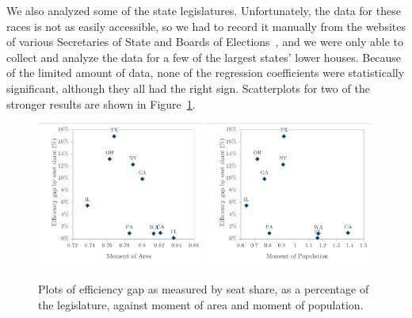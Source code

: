 \documentclass[12pt]{article}
\begin{document}
  We also analyzed some of the state legislatures.  Unfortunately, the data for these races is not as easily accessible, so we had to record it manually from the websites of various Secretaries of State and Boards of Elections~\cite{heda,florida,georgia,illinois,newyork,washington}, and we were only able to collect and analyze the data for a few of the largest states' lower houses.  Because of the limited amount of data, none of the regression coefficients were statistically significant, although they all had the right sign.  Scatterplots for two of the stronger results are shown in Figure~\ref{f:stateplots}.

  \begin{figure}
    \begin{center}
      \includegraphics[width=0.49\textwidth]{sldl-ssp-moment_area.pdf}
      \includegraphics[width=0.49\textwidth]{sldl-ssp-moment_pop.pdf}

      \caption{Plots of efficiency gap as measured by seat share, as a percentage of the legislature, against moment of area and moment of population.\label{f:stateplots}}
    \end{center}
  \end{figure}

  
\end{document}
